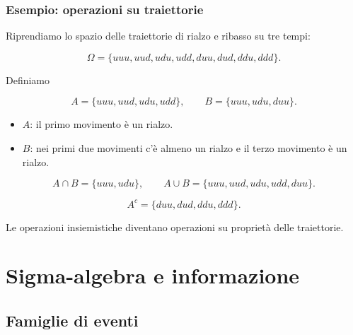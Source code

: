 \documentclass[handout]{beamer}%
\newenvironment{stepitemize}{\begin{itemize}[<+->]}{\end{itemize} }
\providecommand{\1}{\mathbf{1}}
\providecommand{\QTR}[2]{\csname #1\endcsname{#2}}
\begin{document}
\begin{frame}%
%

\frametitle{Esempio: operazioni su traiettorie}%


Riprendiamo lo spazio delle traiettorie di rialzo e ribasso su tre tempi:%

\[
\Omega=\{uuu,uud,udu,udd,duu,dud,ddu,ddd\}.
\]


Definiamo%

\[
A=\{uuu,uud,udu,udd\}, \qquad B=\{uuu,udu,duu\}.
\]


\begin{stepitemize}
\item $A$: il primo movimento \`{e} un rialzo.

\item $B$: nei primi due movimenti c'\`{e} almeno un rialzo e il terzo
movimento \`{e} un rialzo.
\end{stepitemize}%

\[
A\cap B=\{uuu,udu\}, \qquad A\cup B=\{uuu,uud,udu,udd,duu\}.
\]
%

\[
A^{c}=\{duu,dud,ddu,ddd\}.
\]


\medskip

\begin{center}
{\small Le operazioni insiemistiche diventano operazioni su propriet\`{a}
delle traiettorie.}
\end{center}%

\transboxout
\end{frame}%




\section{Sigma-algebra e informazione}

\subsection{Famiglie di eventi}%
\end{document}
